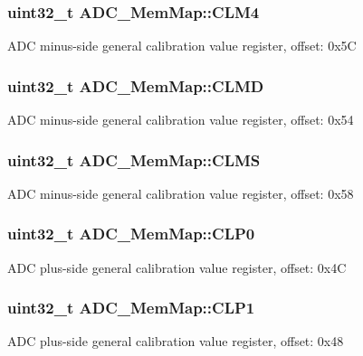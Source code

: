 \subsubsection[{C\+L\+M4}]{\setlength{\rightskip}{0pt plus 5cm}uint32\+\_\+t A\+D\+C\+\_\+\+Mem\+Map\+::\+C\+L\+M4}\label{struct_a_d_c___mem_map_a7b8d8ae0f052a3824d3b34dffdf471e0}
A\+D\+C minus-\/side general calibration value register, offset\+: 0x5\+C \hypertarget{struct_a_d_c___mem_map_ad78aef04412250c47f943c007ad2eed2}{}
\subsubsection[{C\+L\+M\+D}]{\setlength{\rightskip}{0pt plus 5cm}uint32\+\_\+t A\+D\+C\+\_\+\+Mem\+Map\+::\+C\+L\+M\+D}\label{struct_a_d_c___mem_map_ad78aef04412250c47f943c007ad2eed2}
A\+D\+C minus-\/side general calibration value register, offset\+: 0x54 \hypertarget{struct_a_d_c___mem_map_ad4519a320afe549d5b275b534be9bc39}{}
\subsubsection[{C\+L\+M\+S}]{\setlength{\rightskip}{0pt plus 5cm}uint32\+\_\+t A\+D\+C\+\_\+\+Mem\+Map\+::\+C\+L\+M\+S}\label{struct_a_d_c___mem_map_ad4519a320afe549d5b275b534be9bc39}
A\+D\+C minus-\/side general calibration value register, offset\+: 0x58 \hypertarget{struct_a_d_c___mem_map_a936082703bd7b18447b8edeeaa3c0c4f}{}
\subsubsection[{C\+L\+P0}]{\setlength{\rightskip}{0pt plus 5cm}uint32\+\_\+t A\+D\+C\+\_\+\+Mem\+Map\+::\+C\+L\+P0}\label{struct_a_d_c___mem_map_a936082703bd7b18447b8edeeaa3c0c4f}
A\+D\+C plus-\/side general calibration value register, offset\+: 0x4\+C \hypertarget{struct_a_d_c___mem_map_ae99b44e06b93a2b62451162abe0aae92}{}
\subsubsection[{C\+L\+P1}]{\setlength{\rightskip}{0pt plus 5cm}uint32\+\_\+t A\+D\+C\+\_\+\+Mem\+Map\+::\+C\+L\+P1}\label{struct_a_d_c___mem_map_ae99b44e06b93a2b62451162abe0aae92}
A\+D\+C plus-\/side general calibration value register, offset\+: 0x48 \hypertarget{struct_a_d_c___mem_map_aac028a79faac6929bebb1b677b2fbf8b}{}
